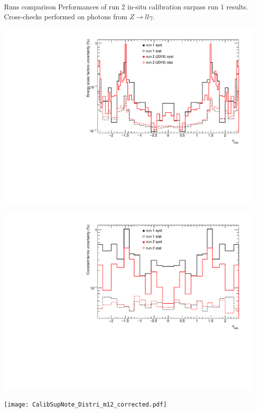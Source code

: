 \begin{frame}{Runs comparison}
  Performances of run 2 in-situ calibration surpass run 1 results.
Cross-checks performed on photons from $Z\rightarrow ll\gamma$.
  \begin{minipage}{0.42\linewidth} 
    \includegraphics[width=\linewidth]{Figures/CompareSystRun_alpha.pdf}
  \end{minipage}
  \hfill
  \begin{minipage}{0.42\linewidth}
    \includegraphics[width=\linewidth]{Figures/CompareSystRun_c.pdf}
  \end{minipage}
  \centering
  \begin{minipage}{0.47\linewidth}
    \texttt{[image: CalibSupNote\_Distri\_m12\_corrected.pdf]}
  \end{minipage}

\end{frame}

